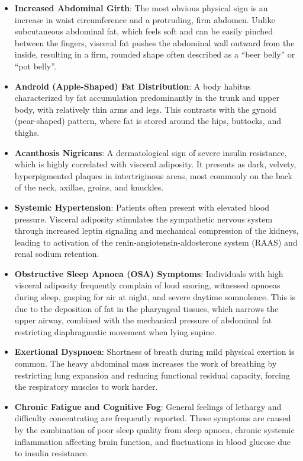 \begin{itemize}
    \item \textbf{Increased Abdominal Girth}: The most obvious physical sign is an increase in waist circumference and a protruding, firm abdomen. Unlike subcutaneous abdominal fat, which feels soft and can be easily pinched between the fingers, visceral fat pushes the abdominal wall outward from the inside, resulting in a firm, rounded shape often described as a ``beer belly'' or ``pot belly''.
    \item \textbf{Android (Apple-Shaped) Fat Distribution}: A body habitus characterized by fat accumulation predominantly in the trunk and upper body, with relatively thin arms and legs. This contrasts with the gynoid (pear-shaped) pattern, where fat is stored around the hips, buttocks, and thighs.
    \item \textbf{Acanthosis Nigricans}: A dermatological sign of severe insulin resistance, which is highly correlated with visceral adiposity. It presents as dark, velvety, hyperpigmented plaques in intertriginous areas, most commonly on the back of the neck, axillae, groins, and knuckles.
    \item \textbf{Systemic Hypertension}: Patients often present with elevated blood pressure. Visceral adiposity stimulates the sympathetic nervous system through increased leptin signaling and mechanical compression of the kidneys, leading to activation of the renin-angiotensin-aldosterone system (RAAS) and renal sodium retention.
    \item \textbf{Obstructive Sleep Apnoea (OSA) Symptoms}: Individuals with high visceral adiposity frequently complain of loud snoring, witnessed apnoeas during sleep, gasping for air at night, and severe daytime somnolence. This is due to the deposition of fat in the pharyngeal tissues, which narrows the upper airway, combined with the mechanical pressure of abdominal fat restricting diaphragmatic movement when lying supine.
    \item \textbf{Exertional Dyspnoea}: Shortness of breath during mild physical exertion is common. The heavy abdominal mass increases the work of breathing by restricting lung expansion and reducing functional residual capacity, forcing the respiratory muscles to work harder.
    \item \textbf{Chronic Fatigue and Cognitive Fog}: General feelings of lethargy and difficulty concentrating are frequently reported. These symptoms are caused by the combination of poor sleep quality from sleep apnoea, chronic systemic inflammation affecting brain function, and fluctuations in blood glucose due to insulin resistance.
\end{itemize}

